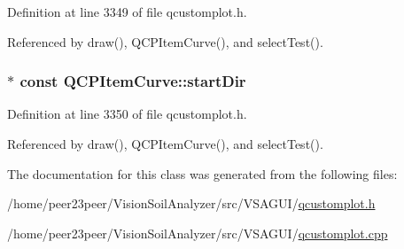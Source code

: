Definition at line 3349 of file qcustomplot.\+h.



Referenced by draw(), Q\+C\+P\+Item\+Curve(), and select\+Test().

\hypertarget{class_q_c_p_item_curve_aa124bf66c09cc51c627fb49db8bf8a7b}{}
\subsubsection[{start\+Dir}]{$\ast$ const Q\+C\+P\+Item\+Curve\+::start\+Dir}\label{class_q_c_p_item_curve_aa124bf66c09cc51c627fb49db8bf8a7b}


Definition at line 3350 of file qcustomplot.\+h.



Referenced by draw(), Q\+C\+P\+Item\+Curve(), and select\+Test().



The documentation for this class was generated from the following files\+:\begin{DoxyCompactItemize}
\item 
/home/peer23peer/\+Vision\+Soil\+Analyzer/src/\+V\+S\+A\+G\+U\+I/\hyperlink{qcustomplot_8h}{qcustomplot.\+h}\item 
/home/peer23peer/\+Vision\+Soil\+Analyzer/src/\+V\+S\+A\+G\+U\+I/\hyperlink{qcustomplot_8cpp}{qcustomplot.\+cpp}\end{DoxyCompactItemize}
